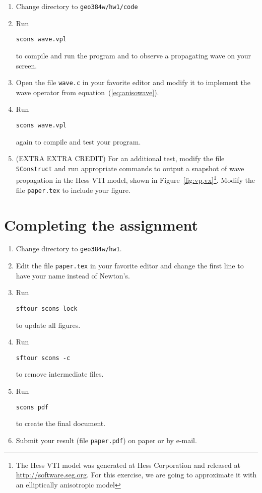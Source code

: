\begin{enumerate}
\item Change directory to \verb#geo384w/hw1/code#
\item Run
\begin{verbatim}
scons wave.vpl
\end{verbatim}
to compile and run the program and to observe a propagating wave on your screen.
\item Open the file \texttt{wave.c} in your favorite editor and modify it to implement the wave operator from equation~(\ref{eq:anisowave}).
\item Run
\begin{verbatim}
scons wave.vpl
\end{verbatim}
again to compile and test your program. 
\item (EXTRA EXTRA CREDIT) For an additional test, modify the file \texttt{SConstruct} and run appropriate commands to output a snapshot of wave propagation in the Hess VTI model, shown in Figure~\ref{fig:vp,vx}\footnote{The Hess VTI model was generated at Hess Corporation and released at \url{http://software.seg.org}. For this exercise, we are going to approximate it with an elliptically anisotropic model}. Modify the file \texttt{paper.tex} to include your figure.
\end{enumerate}


\lstset{language=python,numbers=left,numberstyle=\tiny,showstringspaces=false}


\newpage

\section{Completing the assignment}

\begin{enumerate}
\item Change directory to \verb#geo384w/hw1#.
\item Edit the file \texttt{paper.tex} in your favorite editor and change the
first line to have your name instead of Newton's.
\item Run
\begin{verbatim}
sftour scons lock
\end{verbatim}
to update all figures.
\item Run
\begin{verbatim}
sftour scons -c
\end{verbatim}
  to remove intermediate files.
\item Run
\begin{verbatim} 
scons pdf
\end{verbatim}
to create the final document.
\item Submit your result (file \texttt{paper.pdf}) on paper or by
e-mail.
\end{enumerate}



